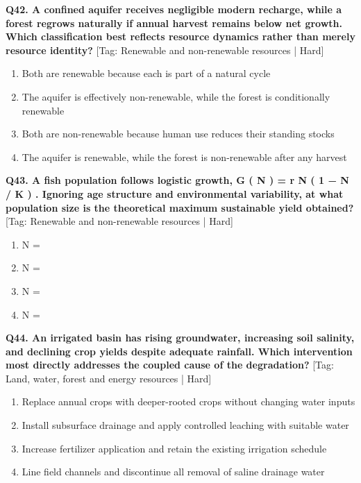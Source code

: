 \noindent\textbf{Q42. A confined aquifer receives negligible modern recharge, while a forest regrows naturally if annual harvest remains below net growth. Which classification best reflects resource dynamics rather than merely resource identity?} \hfill [Tag: Renewable and non-renewable resources | Hard]
\begin{enumerate}[label=(\alph*),topsep=2pt,itemsep=1pt,partopsep=0pt,parsep=0pt]
    \item {Both are renewable because each is part of a natural cycle}
    \item {The aquifer is effectively non-renewable, while the forest is conditionally renewable}
    \item {Both are non-renewable because human use reduces their standing stocks}
    \item {The aquifer is renewable, while the forest is non-renewable after any harvest}
\end{enumerate}
\vspace{2mm}

\noindent\textbf{Q43. A fish population follows logistic growth, G ( N ) = r N ( 1 − N / K ) . Ignoring age structure and environmental variability, at what population size is the theoretical maximum sustainable yield obtained?} \hfill [Tag: Renewable and non-renewable resources | Hard]
\begin{enumerate}[label=(\alph*),topsep=2pt,itemsep=1pt,partopsep=0pt,parsep=0pt]
    \item {N =}
    \item {N =}
    \item {N =}
    \item {N =}
\end{enumerate}
\vspace{2mm}

\noindent\textbf{Q44. An irrigated basin has rising groundwater, increasing soil salinity, and declining crop yields despite adequate rainfall. Which intervention most directly addresses the coupled cause of the degradation?} \hfill [Tag: Land, water, forest and energy resources | Hard]
\begin{enumerate}[label=(\alph*),topsep=2pt,itemsep=1pt,partopsep=0pt,parsep=0pt]
    \item {Replace annual crops with deeper-rooted crops without changing water inputs}
    \item {Install subsurface drainage and apply controlled leaching with suitable water}
    \item {Increase fertilizer application and retain the existing irrigation schedule}
    \item {Line field channels and discontinue all removal of saline drainage water}
\end{enumerate}
\vspace{2mm}


